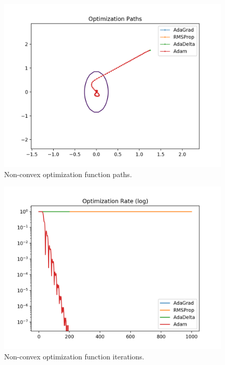 \documentclass[twoside,11pt]{homework}
\DeclarePairedDelimiter{\2norm}{\lVert}{\rVert^2_2}
\newcommand{\1}[1]{\mathds{1}\left[#1\right]}
\begin{document}
\begin{enumerate}[\bf (i)]
\begin{enumerate}
        \begin{figure}[h!]
         \centering
         \includegraphics[width=6in]{img/hard.png}
         \caption{Non-convex optimization function paths.}
         \label{fig:sgdm}
       \end{figure}

       \begin{figure}[h!]
         \centering
         \includegraphics[width=6in]{img/hard2.png}
         \caption{Non-convex optimization function iterations.}
         \label{fig:sgdm2}
       \end{figure}


\end{enumerate}
\end{enumerate}
\end{document}
